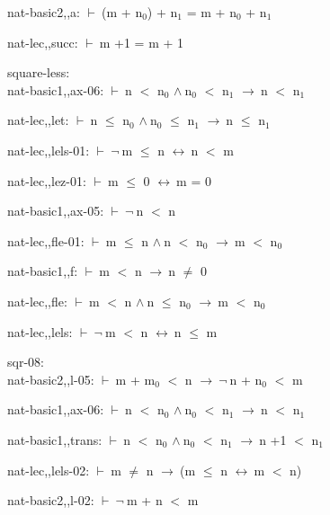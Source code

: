 \documentclass[a4paper]{article}
\newcommand{\Fol}{\mbox{$\vdash\ $}}
\newcommand{\Not}{\mbox{$\neg\ $}}
\newcommand{\And}{\mbox{$\wedge\ $}}
\newcommand{\Imp}{\mbox{$\rightarrow\ $}}
\newcommand{\Equiv}{\mbox{$\leftrightarrow\ $}}
\begin{document}
nat-basic2,,a: 
 \Fol (m + $\mbox{n}_{0}$) + $\mbox{n}_{1}$ = m + $\mbox{n}_{0}$ + $\mbox{n}_{1}$



nat-lec,,succ: 
 \Fol m +1 = m + 1



\bigskip

square-less:\\ nat-basic1,,ax-06: 
 \Fol n $<$ $\mbox{n}_{0}$ \And $\mbox{n}_{0}$ $<$ $\mbox{n}_{1}$ \Imp n $<$ $\mbox{n}_{1}$



nat-lec,,let: 
 \Fol n $\le$ $\mbox{n}_{0}$ \And $\mbox{n}_{0}$ $\le$ $\mbox{n}_{1}$ \Imp n $\le$ $\mbox{n}_{1}$

nat-lec,,lels-01: 
 \Fol \Not m $\le$ n \Equiv n $<$ m



nat-lec,,lez-01: 
 \Fol m $\le$ 0 \Equiv m = 0



nat-basic1,,ax-05: 
 \Fol \Not n $<$ n



nat-lec,,fle-01: 
 \Fol m $\le$ n \And n $<$ $\mbox{n}_{0}$ \Imp m $<$ $\mbox{n}_{0}$



nat-basic1,,f: 
 \Fol m $<$ n \Imp n $\neq$ 0



nat-lec,,fle: 
 \Fol m $<$ n \And n $\le$ $\mbox{n}_{0}$ \Imp m $<$ $\mbox{n}_{0}$



nat-lec,,lels: 
 \Fol \Not m $<$ n \Equiv n $\le$ m



\bigskip

sqr-08:\\ nat-basic2,,l-05: 
 \Fol m + $\mbox{m}_{0}$ $<$ n \Imp \Not n + $\mbox{n}_{0}$ $<$ m



nat-basic1,,ax-06: 
 \Fol n $<$ $\mbox{n}_{0}$ \And $\mbox{n}_{0}$ $<$ $\mbox{n}_{1}$ \Imp n $<$ $\mbox{n}_{1}$



nat-basic1,,trans: 
 \Fol n $<$ $\mbox{n}_{0}$ \And $\mbox{n}_{0}$ $<$ $\mbox{n}_{1}$ \Imp n +1 $<$ $\mbox{n}_{1}$



nat-lec,,lels-02: 
 \Fol m $\neq$ n \Imp (m $\le$ n \Equiv m $<$ n)



nat-basic2,,l-02: 
 \Fol \Not m + n $<$ m
\end{document}
